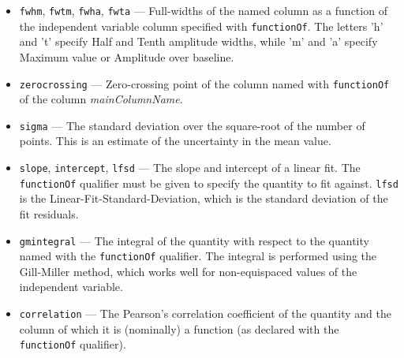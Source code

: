\begin{itemize}
\begin{itemize}
\begin{itemize}
\begin{itemize}
\item {\tt fwhm}, {\tt fwtm}, {\tt fwha}, {\tt fwta} --- Full-widths of the named column as a function
of the independent variable column specified with {\tt functionOf}.  The letters 'h' and 't' specify Half and Tenth
amplitude widths, while 'm' and 'a' specify Maximum value or Amplitude over baseline.

\item {\tt zerocrossing} --- Zero-crossing point of the column named with {\tt functionOf} of the
column {\em mainColumnName}.

\item {\tt sigma} --- The standard deviation over the square-root of the number of points.  This is an
estimate of the uncertainty in the mean value.

\item {\tt slope}, {\tt intercept}, {\tt lfsd} --- The slope and intercept of a linear fit.  The {\tt functionOf}
qualifier must be given to specify the quantity to fit against.  {\tt lfsd} is the Linear-Fit-Standard-Deviation,
which is the standard deviation of the fit residuals.

\item {\tt gmintegral} --- The integral of the quantity with respect to the quantity named with the {\tt functionOf} qualifier.
  The integral is performed using the Gill-Miller method, which works well for non-equispaced values of the independent
  variable.

\item {\tt correlation} --- The Pearson's correlation coefficient of the quantity and the column of which it is 
  (nominally) a function (as declared with the {\tt functionOf} qualifier).

\end{itemize}


\end{itemize}
\end{itemize}
\end{itemize}
